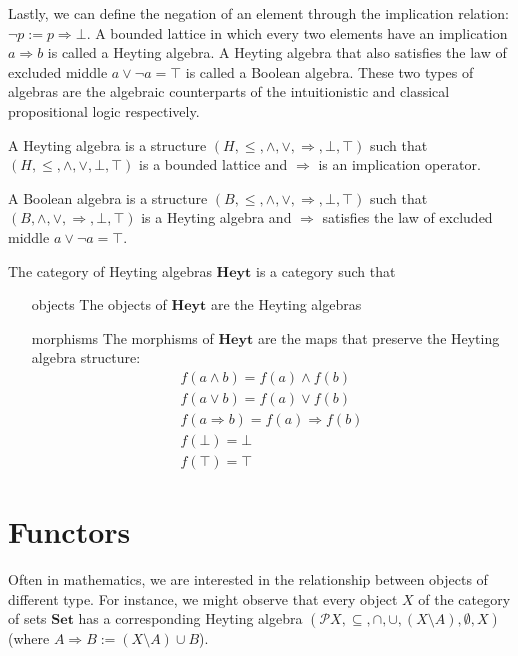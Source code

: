 Lastly, we can define the negation of an element through the implication relation:
$\neg p:=p\Rightarrow \bot$.
A bounded lattice in which every two elements have an implication $a\Rightarrow b$ is called a Heyting algebra.
A Heyting algebra that also satisfies the law of excluded middle $a\vee \neg a=\top$ is called a Boolean algebra.
These two types of algebras are the algebraic counterparts of the intuitionistic and classical propositional logic respectively.
\begin{definition}
    A Heyting algebra is a structure $(H,\leq,\wedge,\vee,\Rightarrow,\bot,\top)$ such that
    $(H,\leq,\wedge,\vee,\bot,\top)$ is a bounded lattice
    and $\Rightarrow$ is an implication operator.

    A Boolean algebra is a structure $(B,\leq,\wedge,\vee,\Rightarrow,\bot,\top)$ such that
    $(B,\wedge,\vee,\Rightarrow,\bot,\top)$ is a Heyting algebra
    and $\Rightarrow$ satisfies the law of excluded middle $a\vee \neg a=\top$.
\end{definition}

\begin{definition}
    The category of Heyting algebras $\mathbf{Heyt}$ is a category such that
    \begin{itemize}
        \item[objects] The objects of $\mathbf{Heyt}$ are the Heyting algebras
        \item[morphisms] The morphisms of $\mathbf{Heyt}$ are the maps that preserve the Heyting algebra structure:
        \begin{gather*}
            f(a\wedge b)=f(a)\wedge f(b)\\
            f(a\vee b)=f(a)\vee f(b)\\
            f(a\Rightarrow b)=f(a)\Rightarrow f(b)\\
            f(\bot)=\bot\\
            f(\top)=\top
        \end{gather*}
    \end{itemize}
\end{definition}
\section{Functors}
Often in mathematics, we are interested in the relationship between objects of different type.
For instance, we might observe that every object $X$ of the category of sets $\mathbf{Set}$
has a corresponding Heyting algebra $(\mathcal{P}X,\subseteq,\cap,\cup,(X\setminus A),\emptyset,X)$
(where $A\Rightarrow B:=(X\setminus A)\cup B$).

